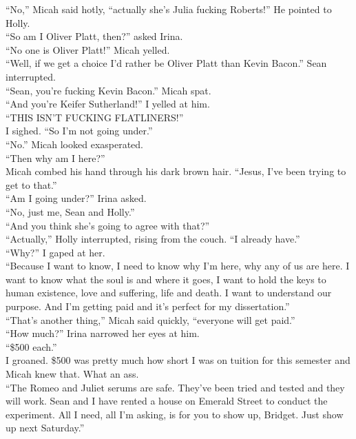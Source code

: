 \documentclass[a5paper]{scrartcl}
\begin{document}
\enquote{No,} Micah said hotly, \enquote{actually she's Julia fucking Roberts!} He pointed to Holly.\\
\enquote{So am I Oliver Platt, then?} asked Irina.\\
\enquote{No one is Oliver Platt!} Micah yelled.\\
\enquote{Well, if we get a choice I'd rather be Oliver Platt than Kevin Bacon.} Sean interrupted.\\
\enquote{Sean, you're fucking Kevin Bacon.} Micah spat.\\
\enquote{And you're Keifer Sutherland!} I yelled at him.\\
\enquote{THIS ISN'T FUCKING FLATLINERS!}\\
I sighed. \enquote{So I'm not going under.}\\
\enquote{No.} Micah looked exasperated.\\
\enquote{Then why am I here?}\\
Micah combed his hand through his dark brown hair. \enquote{Jesus, I've been trying to get to that.}\\
\enquote{Am I going under?} Irina asked.\\
\enquote{No, just me, Sean and Holly.}\\
\enquote{And you think she's going to agree with that?}\\
\enquote{Actually,} Holly interrupted, rising from the couch. \enquote{I already have.}\\
\enquote{Why?} I gaped at her.\\
\enquote{Because I want to know, I need to know why I'm here, why any of us are here. I want to know what the soul is and where it goes, I want to hold the keys to human existence, love and suffering, life and death. I want to understand our purpose. And I'm getting paid and it's perfect for my dissertation.}\\
\enquote{That's another thing,} Micah said quickly, \enquote{everyone will get paid.}\\
\enquote{How much?} Irina narrowed her eyes at him.\\
\enquote{\$500 each.}\\
I groaned. \$500 was pretty much how short I was on tuition for this semester and Micah knew that. What an ass.\\
\enquote{The Romeo and Juliet serums are safe. They've been tried and tested and they will work. Sean and I have rented a house on Emerald Street to conduct the experiment. All I need, all I'm asking, is for you to show up, Bridget. Just show up next Saturday.}\\
\end{document}
